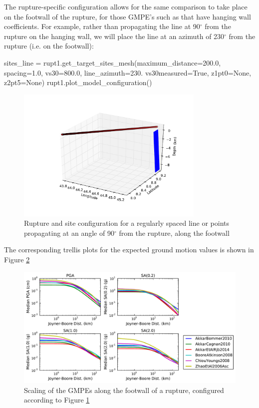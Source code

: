 The rupture-specific configuration allows for the same comparison to take place on the footwall of the rupture, for those GMPE's such as \textcite{chiou2008} that have hanging wall coefficients. For example, rather than propagating the line at 90$^{\circ}$ from the rupture on the hanging wall, we will place the line at an azimuth of 230$^{\circ}$ from the rupture (i.e. on the footwall):

\begin{python}
sites_line = rupt1.get_target_sites_mesh(maximum_distance=200.0,
                                         spacing=1.0,
                                         vs30=800.0,
                                         line_azimuth=230.
                                         vs30measured=True,
                                         z1pt0=None,
                                         z2pt5=None)
rupt1.plot_model_configuration()
\end{python}

\begin{figure}[htbp]
	\centering
		\includegraphics[width=9cm]{./figures/trellis/rupt_config_footwall.pdf}
	\caption{Rupture and site configuration for a regularly spaced line or points propagating at an angle of 90$^{\circ}$ from the rupture, along the  footwall}
	\label{fig:rupt_config_footwall}
\end{figure}

The corresponding trellis plots for the expected ground motion values is shown in Figure \ref{fig:distance_footwall_trellis_rupt}
\begin{figure}[htb]
	\centering
		\includegraphics[width=\textwidth]{./figures/trellis/distance_footwall_trellis_rupt.pdf}
	\caption{Scaling of the GMPEs along the footwall of a rupture, configured according to Figure \ref{fig:rupt_config_footwall}}
	\label{fig:distance_footwall_trellis_rupt}
\end{figure}

